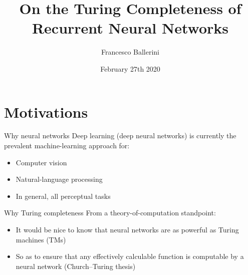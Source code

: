 \documentclass{beamer}
\title[Turing Completeness of RNNs]{On the Turing Completeness of Recurrent Neural Networks}
\author{Francesco Ballerini}
\institute[]
{
Università degli Studi di Firenze\\ 
Scuola di Ingegneria 
}
\date{February 27th 2020}
\begin{document}
{
	\begin{frame}
		\titlepage 
	\end{frame}
}

\section{Motivations}

\begin{frame}{Why neural networks}
	\textcolor{unifiRed}{Deep learning} (deep neural networks) is currently the prevalent machine-learning approach for:
	\begin{itemize}
		\pause
		\item Computer vision
		\pause
		\item Natural-language processing
		\pause
		\item In general, all perceptual tasks
	\end{itemize}
\end{frame}

\begin{frame}{Why Turing completeness}	
	From a theory-of-computation standpoint:
	\begin{itemize}
		\pause 
		\item It would be nice to know that neural networks are as powerful as Turing machines (TMs)
		\pause
		\item So as to ensure that any \textcolor{unifiRed}{effectively calculable} function is computable by a neural network (Church--Turing thesis)
	\end{itemize}
\end{frame}
\end{document}
